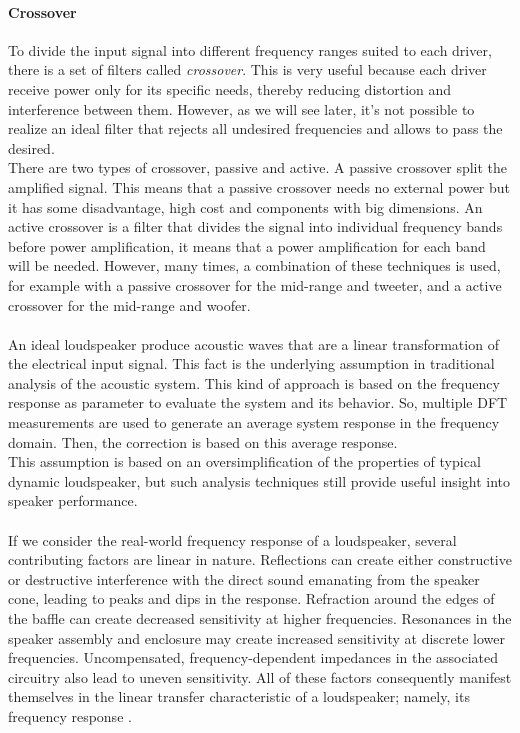 \paragraph{Crossover} To divide the input signal into different frequency ranges suited to each driver, there is a set of filters called \textit{crossover}. This is very useful because each driver receive power only for its specific needs, thereby reducing distortion and interference between them. However, as we will see later, it's not possible to realize an ideal filter that rejects all undesired frequencies and allows to pass the desired.\\
There are two types of crossover, passive and active. A passive crossover split the amplified signal. This means that a passive crossover needs no external power but it has some disadvantage, high cost and components with big dimensions.
An active crossover is a filter that divides the signal into individual frequency bands before power amplification, it means that a power amplification for each band will be needed. However, many times, a combination of these techniques is used, for example with a passive crossover for the mid-range and tweeter, and a active crossover for the mid-range and woofer.\\\\
An ideal loudspeaker produce acoustic waves that are a linear transformation of the electrical input signal. This fact is the underlying assumption in traditional analysis of the acoustic system. This kind of approach is based on the frequency response as parameter to evaluate the system and its behavior. So, multiple DFT measurements are used to generate an average system response in the frequency domain. Then, the correction is based on this average response. \\ 
This assumption is based on an oversimplification of the properties of typical dynamic loudspeaker, but such analysis techniques still provide useful insight into speaker performance.\\\\
If we consider the real-world frequency response of a loudspeaker, several contributing factors are linear in nature. Reflections can create either constructive or destructive interference with the direct sound emanating from the speaker cone, leading to peaks and dips in the response. Refraction around the edges of the baffle can create decreased sensitivity at higher frequencies.
Resonances in the speaker assembly and enclosure may create increased sensitivity at discrete lower frequencies. Uncompensated, frequency-dependent impedances in the associated circuitry also lead to uneven sensitivity. All of these factors consequently manifest themselves in the linear transfer characteristic of a loudspeaker; namely, its frequency response \cite{loudspeakerchar}.\\\\
